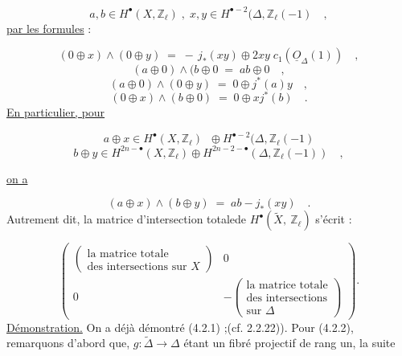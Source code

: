 \begin{equation*}
a,b \in H^{\bullet}(X,\mathbb{Z}_{\ell}) \;,\; x,y \in H^{\bullet-2}(\Delta,\mathbb{Z}_{\ell}(-1) \quad ,
\end{equation*}
\underline{par les formules} :

\begin{equation}\tag{4.2.3.1}
(0 \oplus x) \wedge (0 \oplus y) \;=\; -\, j_{*}(xy) \oplus 2xy \; c_{1}(\underline{O}_{\Delta}(1)) \quad ,
\end{equation}
\begin{equation}\tag{4.2.3.2}
(a \oplus 0) \wedge (b \oplus 0 \;=\; ab \oplus 0 \quad ,
\end{equation}
\begin{equation}\tag{4.2.3.3}
(a \oplus 0) \wedge (0 \oplus y) \;=\; 0 \oplus j^{*}(a)y \quad ,
\end{equation}
\begin{equation}\tag{4.2.3.4}
(0 \oplus x) \wedge (b \oplus 0) \;=\; 0 \oplus xj^{*}(b) \quad .
\end{equation}
\underline{En particulier, pour}

\begin{equation*}
a \oplus x \in H^{\bullet}(X,\mathbb{Z}_{\ell}) \;\; \oplus H^{\bullet-2}(\Delta,\mathbb{Z}_{\ell}(-1)
\end{equation*}
\begin{equation*}
b \oplus y \in H^{2n-\bullet}(X,\mathbb{Z}_{\ell}) \oplus H^{2n-2-\bullet}(\Delta,\mathbb{Z}_{\ell}(-1)) \quad , 
\end{equation*}


 \underline{on a}

\begin{equation}\tag{4.2.3.5}
(a \oplus x) \wedge (b \oplus y) \;=\; ab - j_{*}(xy) \quad .
\end{equation}
Autrement dit, la matrice d'intersection totalede $H^{\bullet}(\widetilde{X},\ \mathbb{Z}_{\ell})$ s'écrit :

\begin{equation*}
\left(
\begin{array}{c|c}
\left(\begin{array}{l}\mbox{la matrice totale}\\ \mbox{des intersections sur } X\end{array}\right) & 0 \\ \hline
0 & -\left(\begin{array}{l}\mbox{la matrice totale}\\ \mbox{des intersections}\\ \mbox{sur } \Delta\end{array}\right)
\end{array}
\right) .
\end{equation*}
\underline{Démonstration.}  On a déjà démontré (4.2.1) ;(cf. 2.2.22)). Pour (4.2.2), remarquons d'abord que, $g : \widetilde{\Delta} \longrightarrow \Delta$ étant un fibré projectif de rang un, la suite

